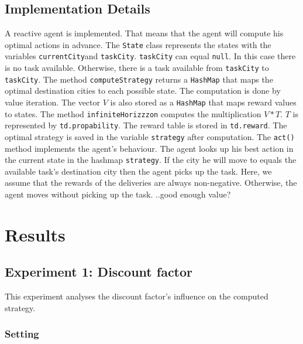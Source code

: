 \documentclass[11pt]{article}
\begin{document}
\subsection{Implementation Details}
A reactive agent is implemented. That means that the agent will compute his optimal actions in advance. 
The {\tt State} class represents the states with the variables {\tt currentCity}and {\tt taskCity}. {\tt taskCity} can equal {\tt null}. In this case there is no task available. Otherwise, there is a task available from {\tt taskCity} to {\tt taskCity}. 
The method {\tt computeStrategy} returns a {\tt HashMap} that maps the optimal destination cities to each possible state. The computation is done by value iteration. The vector \(V\) is also stored as a {\tt HashMap} that maps reward values to states. 
The method {\tt infiniteHorizzzon} computes the multiplication \(V*T\). \(T\) is represented by {\tt td.propability}. 
The reward table is stored in {\tt td.reward}. The optimal strategy is saved in the variable {\tt strategy} after computation.
The {\tt act()} method implements the agent's behaviour. The agent looks up his best action in the current state in the hashmap {\tt strategy}. If the city he will move to equals the available task's destination city then the agent picks up the task. Here, we assume that the rewards of the deliveries are always non-negative. Otherwise, the agent moves without picking up the task. ..good enough value?


\section{Results}

\subsection{Experiment 1: Discount factor}
This experiment analyses the discount factor's influence on the computed strategy.  
\subsubsection{Setting}

\end{document}
